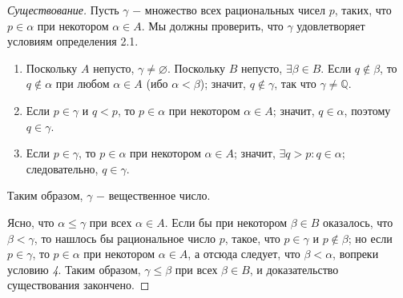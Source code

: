\documentclass{article}
\begin{document}
\begin{proof}[Существование]
Пусть \(\gamma\) \(-\) множество всех рациональных чисел \(p\), таких, что \(p \in \alpha\) при некотором \(\alpha \in A\). Мы должны проверить, что \(\gamma\) удовлетворяет условиям определения 2.1.

\renewcommand{\labelenumi}{\Roman{enumi}}
\begin{enumerate}
    \item Поскольку \(A\) непусто, \(\gamma \neq \varnothing\). Поскольку \(B\) непусто, \(\exists \beta \in B\). Если \(q \notin \beta\), то \(q \notin \alpha\) при любом \(\alpha \in A\) (ибо \(\alpha < \beta\)); значит, \(q \notin \gamma\), так что \(\gamma \neq \mathbb{Q}\).
    \item Если \(p \in \gamma\) и \(q < p\), то \(p \in \alpha\) при некотором \(\alpha \in A\); значит, \(q \in \alpha\), поэтому \(q \in \gamma\).
    \item Если \(p \in \gamma\), то \(p \in \alpha\) при некотором \(\alpha \in A\); значит, \(\exists q > p : q \in \alpha\); следовательно, \(q \in \gamma\).
\end{enumerate}

Таким образом, \(\gamma\) \(-\) вещественное число.

Ясно, что \(\alpha \leq \gamma\) при всех \(\alpha \in A\). Если бы при некотором \(\beta \in B\) оказалось, что \(\beta < \gamma\), то нашлось бы рациональное число \(p\), такое, что \(p \in \gamma\) и \(p \notin \beta\); но если \(p \in \gamma\), то \(p \in \alpha\) при некотором \(\alpha \in A\), а отсюда следует, что \(\beta < \alpha\), вопреки условию \textit{4}. Таким образом, \(\gamma \leq \beta\) при всех \(\beta \in B\), и доказательство существования закончено.

\end{proof}
\end{document}
